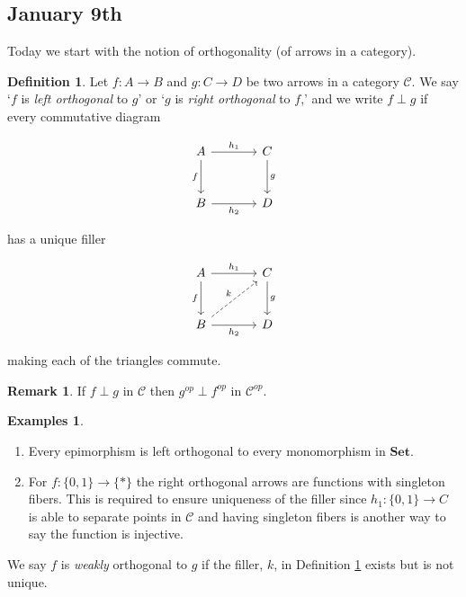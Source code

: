 \documentclass[11pt]{amsart}
\theoremstyle{plain}
\theoremstyle{definition}
\newtheorem{defn}[thm]{Definition}
\newtheorem*{rem*}{Remark}
\newtheorem*{egs*}{Examples}
\newcommand{\cC}{{\mathcal C}}
\newcommand{\Set}{{\mathbf{Set}}}
\newcommand{\noi}{{\noindent}}
\begin{document}
\subsection{January 9th}

Today we start with the notion of orthogonality (of arrows in a category). 

\begin{defn}\label{def orthogonal arrows}
Let $f : A \to B$ and $g : C \to D$ be two arrows in a category $\cC$. We say `$f$ is \textit{left orthogonal} to $g$' or `$g$ is \textit{right orthogonal} to $f${,}' and we write $f \perp g$ if every commutative diagram 

\[ \begin{tikzcd}[column sep = large , row sep = large]
  A \dar["f"'] \rar["h_1"] & C\dar["g"] \\
  B \rar["h_2"'] & D
\end{tikzcd}\]

\noi has a unique filler 

\[ \begin{tikzcd}[column sep = large , row sep = large]
  A \dar["f"'] \rar["h_1"] & C\dar["g"] \\
  B \ar[ur, dashed, "k"] \rar["h_2"'] & D
\end{tikzcd}\]

\noi making each of the triangles commute. 
\end{defn}

\begin{rem*}
If $f \perp g$ in $\cC$ then $g^{op} \perp f^{op}$ in $\cC^{op}$. 
\end{rem*}

\begin{egs*}\
\begin{enumerate}[label=(\alph*)]
\item Every epimorphism is left orthogonal to every monomorphism in $\Set$. 
\item For $f : \{0,1\} \to \{ *\}$ the right orthogonal arrows are functions with singleton fibers. This is required to ensure uniqueness of the filler since $h_1 : \{0,1\} \to C$ is able to separate points in $\cC$ and having singleton fibers is another way to say the function is injective. 
\end{enumerate}
\end{egs*}

\noi We say $f$ is \textit{weakly} orthogonal to $g$ if the filler, $k$, in Definition \ref{def orthogonal arrows} exists but is not unique. 
\end{document}
